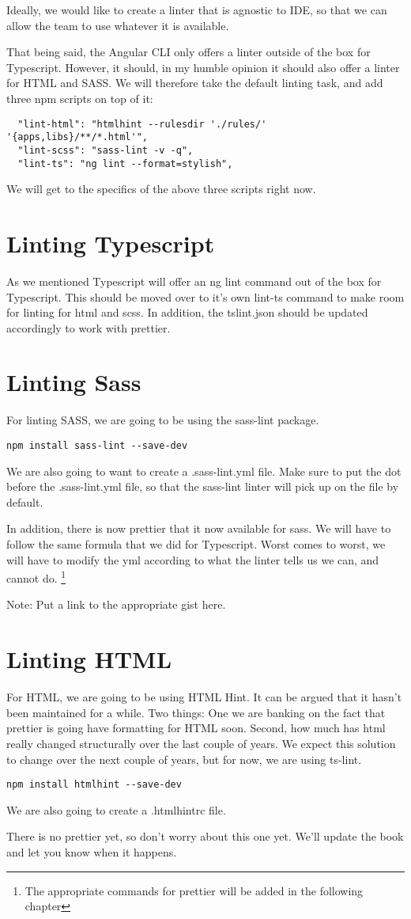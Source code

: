 Ideally, we would like to create a linter that is agnostic to IDE, so that we
can allow the team to use whatever it is available.

That being said, the Angular CLI only offers a linter outside of the box for
Typescript. However, it should, in my humble opinion it should also offer a
linter for HTML and SASS. We will therefore take the default linting task, and
add three npm scripts on top of it:

\begin{lstlisting}
  "lint-html": "htmlhint --rulesdir './rules/' '{apps,libs}/**/*.html'",
  "lint-scss": "sass-lint -v -q",
  "lint-ts": "ng lint --format=stylish",
\end{lstlisting}

We will get to the specifics of the above three scripts right now.

\section{ Linting Typescript }
As we mentioned Typescript will offer an ng lint command out of the box for
Typescript. This should be moved over to it's own lint-ts command to make room
for linting for html and scss. In addition, the tslint.json should be updated
accordingly to work with prettier.

\section{ Linting Sass }
For linting SASS, we are going to be using the sass-lint package.
\begin{lstlisting}
npm install sass-lint --save-dev
\end{lstlisting}

We are also going to want to create a .sass-lint.yml file. Make sure to put the
dot before the .sass-lint.yml file, so that the sass-lint linter will pick up
on the file by default.

In addition, there is now prettier that it now available for sass. We will have
to follow the same formula that we did for Typescript. Worst comes to worst, we
will have to modify the yml according to what the linter tells us we can, and
cannot do. \footnote{The appropriate commands for prettier will be added in the
following chapter}

Note: Put a link to the appropriate gist here.

\section{ Linting HTML }
For HTML, we are going to be using HTML Hint. It can be argued that it hasn't
been maintained for a while. Two things: One we are banking on the fact that
prettier is going have formatting for HTML soon. Second, how much has html really
changed structurally over the last couple of years. We expect this solution to
change over the next couple of years, but for now, we are using ts-lint.

\begin{lstlisting}
npm install htmlhint --save-dev
\end{lstlisting}

We are also going to create a .htmlhintrc file.

There is no prettier yet, so don't worry about this one yet. We'll update the
book and let you know when it happens.
